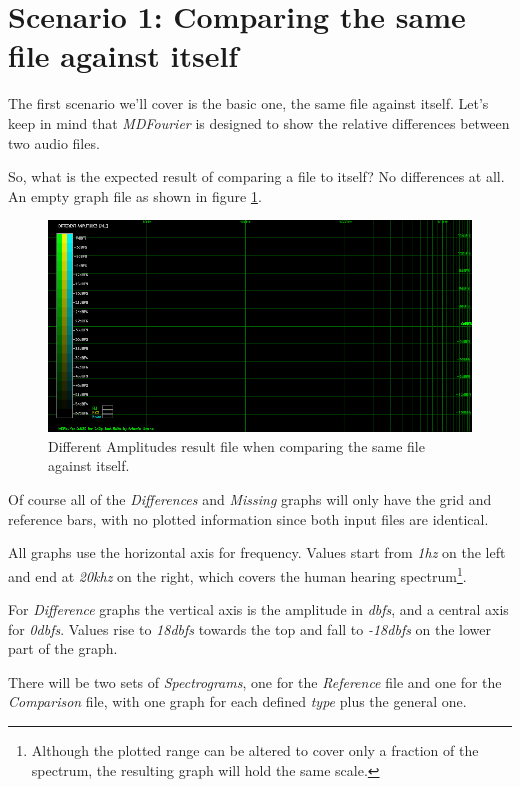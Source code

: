 \documentclass[10pt,a4paper]{report}
\newcommand{\ac}[1]{\textit{\acrshort{#1}}}
\newcommand{\hz}[1]{\textit{#1\acrshort{hz}}}
\newcommand{\khz}[1]{\textit{#1\acrshort{khz}}}
\newcommand{\db}[1]{\textit{#1\acrshort{dbfs}}}
\begin{document}
\section{Scenario 1: Comparing the same file against itself}
\label{scenario1}

The first scenario we'll cover is the basic one, the same file against itself. Let's keep in mind that \textit{MDFourier} is designed to show the relative differences between two audio files.

So, what is the expected result of comparing a file to itself? No differences at all. An empty graph file as shown in figure \ref{fig:plot1-samefile}.

\begin{figure}[H]
	\centering
	\includegraphics[width=1.0\linewidth]{images/interpretation/Plot1-SameFile.png}
	\caption[Same file compared]{Different Amplitudes result file when comparing the same file against itself.}
	\label{fig:plot1-samefile}
\end{figure}

Of course all of the \textit{Differences} and \textit{Missing} graphs will only have the grid and reference bars, with no plotted information since both input files are identical.

All graphs use the horizontal axis for frequency. Values start from \hz{1} on the left and end at  \khz{20} on the right, which covers the human hearing spectrum\footnote{Although the plotted range can be altered to cover only a fraction of the spectrum, the resulting graph will hold the same scale.}.

For \textit{Difference} graphs the vertical axis is the amplitude in \ac{dbfs}, and a central axis for \db{0}. Values rise to \db{18} towards the top and fall to \db{-18} on the lower part of the graph.

There will be two sets of \textit{Spectrograms}, one for the \textit{Reference} file and one for the \textit{Comparison} file, with one graph for each defined \textit{type} plus the general one.
\end{document}
